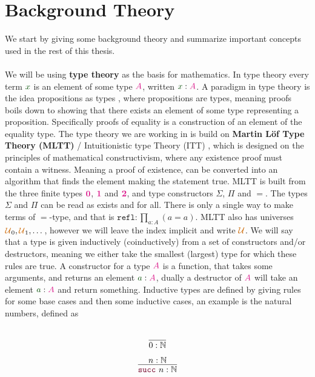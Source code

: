 \documentclass[twoside,11pt,openright]{report}
\theoremstyle{plain} %
\theoremstyle{definition}
\theoremstyle{remark}
\newcommand*{\term}[1]{\textcolor{green!30!black}{#1}} %
\newcommand*{\type}[1]{\textcolor{magenta!90!black}{#1}}
\newcommand*{\universe}[1]{\textcolor{orange!80!black}{#1}}
\newcommand*{\unit}{\type{\textbf{1}}}
\newcommand*{\empt}{\type{\textbf{0}}}
\newcommand*{\constructor}[1]{\textcolor{purple!60!black}{\ensuremath{\mathtt{#1}}}}
\begin{document}
\section{Background Theory}
We start by giving some background theory and summarize important concepts used in the rest of this thesis.
\\ \\
We will be using \textbf{type theory} \cite{nlab:type_theory} as the basis for mathematics. In type theory every term \(\term{x}\) is an element of some type \(\type{A}\), written \(\term{x} : \type{A}\). A paradigm in type theory is the idea propositions as types \cite{nlab:propositions_as_types}, where propositions are types, meaning proofs boils down to showing that there exists an element of some type representing a proposition. Specifically proofs of equality is a construction of an element of the equality type. The type theory we are working in is build on \textbf{Martin L\"of Type Theory (MLTT)} / Intuitionistic type Theory (ITT) \cite{nlab:martin-loef_dependent_type_theory}, which is designed on the principles of mathematical constructivism, where any existence proof must contain a witness. Meaning a proof of existence, can be converted into an algorithm that finds the element making the statement true. MLTT is built from the three finite types \(\empt\), \(\unit\) and \(\type{\mathbf{2}}\), and type constructors \(\Sigma\), \(\Pi\) and \(=\). The types \(\Sigma\) and \(\Pi\) can be read as exists and for all. There is only a single way to make terms of \(=\)-type, and that is \(\mathtt{refl} : \prod_{a : A} (a = a)\). MLTT also has universes \(\universe{\mathcal{U}}_0, \universe{\mathcal{U}}_1, \dots\), however we will leave the index implicit and write \(\universe{\mathcal{U}}\).  We will say that a type is given inductively (coinductively) from a set of constructors and/or destructors, meaning we either take the smallest (largest) type for which these rules are true. A constructor for a type \(\type{A}\) is a function, that takes some arguments, and returns an element \(\term{a} : \type{A}\), dually a destructor of \(\type{A}\) will take an element \(\term{a} : \type{A}\) and return something. Inductive types are defined by giving rules for some base cases and then some inductive cases, an example is the natural numbers, defined as\\[-10mm]
\begin{center}
  \strut
  \hfill
  \begin{minipage}{0.15\linewidth}
    \begin{equation}
      \vcenter{\infer{0 : \mathbb{N}}{\strut}}
    \end{equation}
  \end{minipage}
  \hfill
  \begin{minipage}{0.20\linewidth}
    \begin{equation}
      \vcenter{\infer{\constructor{succ}~n : \mathbb{N}}{n : \mathbb{N}}}
    \end{equation}
  \end{minipage}
  \hfill
  \strut
\end{center}
\end{document}
